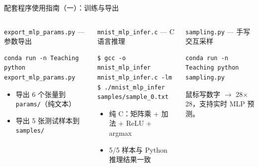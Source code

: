 \documentclass[aspectratio=169]{ctexbeamer}
\begin{document}
\begin{frame}[fragile,shrink=15]{配套程序使用指南（一）：训练与导出}
\begin{columns}[T]
\begin{block}{\texttt{export\_mlp\_params.py} — 参数导出}
\begin{lstlisting}[basicstyle=\ttfamily\scriptsize, frame=none, numbers=none, backgroundcolor=\color{codebg}]
conda run -n Teaching python export_mlp_params.py
\end{lstlisting}
\vspace{-0.35cm}
\begin{itemize}
  \item 导出 6 个张量到 \texttt{params/}（纯文本）
  \item 导出 5 张测试样本到 \texttt{samples/}
\end{itemize}
\end{block}

\vspace{0.05cm}

\begin{block}{\texttt{mnist\_mlp\_infer.c} — C 语言推理}
\begin{lstlisting}[basicstyle=\ttfamily\scriptsize, frame=none, numbers=none, backgroundcolor=\color{codebg}]
$ gcc -o mnist_mlp_infer mnist_mlp_infer.c -lm
$ ./mnist_mlp_infer samples/sample_0.txt
\end{lstlisting}
\vspace{-0.35cm}
\begin{itemize}
  \item 纯 C：矩阵乘 + 加法 + ReLU + argmax
  \item 5/5 样本与 Python 推理结果一致
\end{itemize}
\end{block}

\vspace{0.05cm}

\begin{block}{\texttt{sampling.py} — 手写交互采样}
\begin{lstlisting}[basicstyle=\ttfamily\scriptsize, frame=none, numbers=none, backgroundcolor=\color{codebg}]
conda run -n Teaching python sampling.py
\end{lstlisting}
\vspace{-0.35cm}
鼠标写数字 $\to$ 28$\times$28，支持实时 MLP 预测。
\end{block}
\end{columns}
\end{frame}
\end{document}

